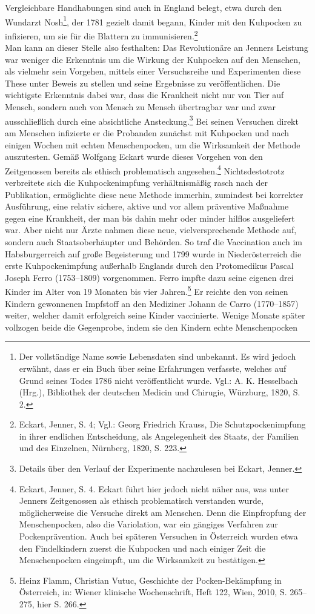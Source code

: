 \documentclass[
    a4paper,
    12pt,
    hyphens,
    chapterprefix=true,
    headheight=33pt,
    footheight=29pt,
    headings=optiontohead,
]{scrartcl}
\begin{document}
\pagebreak
Vergleichbare Handhabungen sind auch in England belegt, etwa durch den Wundarzt Nosh\footnote{Der vollständige Name sowie Lebensdaten sind unbekannt. Es wird jedoch erwähnt, dass er ein Buch über seine Erfahrungen verfasste, welches auf Grund seines Todes 1786 nicht veröffentlicht wurde. Vgl.: A. K. Hesselbach (Hrg.), Bibliothek der deutschen Medicin und Chirugie, Würzburg, 1820, S. 2.}, der 1781 gezielt damit begann, Kinder mit den Kuhpocken zu infizieren, um sie für die Blattern zu immunisieren.\footnote{Eckart, Jenner, S. 4; Vgl.: Georg Friedrich Krauss, Die Schutzpockenimpfung in ihrer endlichen Entscheidung, als Angelegenheit des Staats, der Familien und des Einzelnen, Nürnberg, 1820, S. 223.} \\
Man kann an dieser Stelle also festhalten: Das Revolutionäre an Jenners Leistung war weniger die Erkenntnis um die Wirkung der Kuhpocken auf den Menschen, als vielmehr sein Vorgehen, mittels einer Versuchsreihe und Experimenten diese These unter Beweis zu stellen und seine Ergebnisse zu veröffentlichen. Die wichtigste Erkenntnis dabei war, dass die Krankheit nicht nur von Tier auf Mensch, sondern auch von Mensch zu Mensch übertragbar war und zwar ausschließlich durch eine absichtliche Ansteckung.\footnote{Details über den Verlauf der Experimente nachzulesen bei Eckart, Jenner.} Bei seinen Versuchen direkt am Menschen infizierte er die Probanden zunächst mit Kuhpocken und nach einigen Wochen mit echten Menschenpocken, um die Wirksamkeit der Methode auszutesten. Gemäß Wolfgang Eckart wurde dieses Vorgehen von den Zeitgenossen bereits als ethisch problematisch angesehen.\footnote{Eckart, Jenner, S. 4. Eckart führt hier jedoch nicht näher aus, was unter Jenners Zeitgenossen als ethisch problematisch verstanden wurde, möglicherweise die Versuche direkt am Menschen. Denn die Einpfropfung der Menschenpocken, also die Variolation, war ein gängiges Verfahren zur Pockenprävention. Auch bei späteren Versuchen in Österreich wurden etwa den Findelkindern zuerst die Kuhpocken und nach einiger Zeit die Menschenpocken eingeimpft, um die Wirksamkeit zu bestätigen.} Nichtsdestotrotz verbreitete sich die Kuhpockenimpfung verhältnismäßig rasch nach der Publikation, ermöglichte diese neue Methode immerhin, zumindest bei korrekter Ausführung, eine relativ sichere, aktive und vor allem präventive Maßnahme gegen eine Krankheit, der man bis dahin mehr oder minder hilflos ausgeliefert war. Aber nicht nur Ärzte nahmen diese neue, vielversprechende Methode auf, sondern auch Staatsoberhäupter und Behörden. So traf die Vaccination auch im Habsburgerreich auf große Begeisterung und 1799 wurde in Niederösterreich die erste Kuhpockenimpfung außerhalb Englands durch den Protomedikus Pascal Joseph Ferro (1753--1809) vorgenommen. Ferro impfte dazu seine eigenen drei Kinder im Alter von 19 Monaten bis vier Jahren.\footnote{Heinz Flamm, Christian Vutuc, Geschichte der Pocken-Bekämpfung in Österreich, in: Wiener klinische Wochenschrift, Heft 122, Wien, 2010, S. 265--275, hier S. 266.} Er reichte den von seinen Kindern gewonnenen Impfstoff an den Mediziner Johann de Carro (1770--1857) weiter, welcher damit erfolgreich seine Kinder vaccinierte. Wenige Monate später vollzogen beide die Gegenprobe, indem sie den Kindern echte Menschenpocken 
\end{document}
